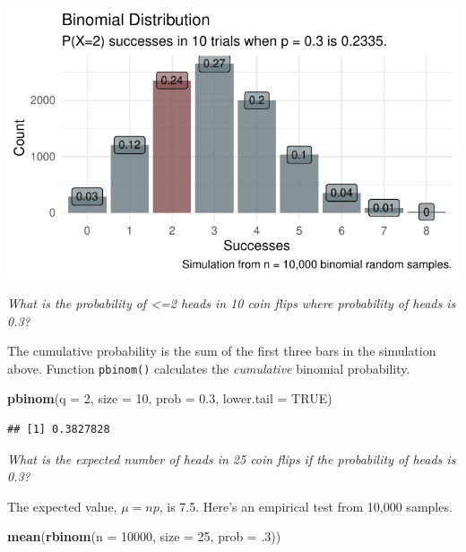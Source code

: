 \documentclass[
]{book}
\newenvironment{Shaded}{\begin{snugshade}}{\end{snugshade}}
\newcommand{\DataTypeTok}[1]{\textcolor[rgb]{0.13,0.29,0.53}{#1}}
\newcommand{\DecValTok}[1]{\textcolor[rgb]{0.00,0.00,0.81}{#1}}
\newcommand{\FloatTok}[1]{\textcolor[rgb]{0.00,0.00,0.81}{#1}}
\newcommand{\KeywordTok}[1]{\textcolor[rgb]{0.13,0.29,0.53}{\textbf{#1}}}
\newcommand{\NormalTok}[1]{#1}
\newcommand{\OtherTok}[1]{\textcolor[rgb]{0.56,0.35,0.01}{#1}}
\begin{document}
\includegraphics{data-sci_files/figure-latex/unnamed-chunk-3-1.pdf}

\emph{What is the probability of \textless=2 heads in 10 coin flips where probability of heads is 0.3?}

The cumulative probability is the sum of the first three bars in the simulation above. Function \texttt{pbinom()} calculates the \emph{cumulative} binomial probability.

\begin{Shaded}
\begin{Highlighting}[]
\KeywordTok{pbinom}\NormalTok{(}\DataTypeTok{q =} \DecValTok{2}\NormalTok{, }\DataTypeTok{size =} \DecValTok{10}\NormalTok{, }\DataTypeTok{prob =} \FloatTok{0.3}\NormalTok{, }\DataTypeTok{lower.tail =} \OtherTok{TRUE}\NormalTok{)}
\end{Highlighting}
\end{Shaded}

\begin{verbatim}
## [1] 0.3827828
\end{verbatim}

\emph{What is the expected number of heads in 25 coin flips if the probability of heads is 0.3?}

The expected value, \(\mu = np\), is 7.5. Here's an empirical test from 10,000 samples.

\begin{Shaded}
\begin{Highlighting}[]
\KeywordTok{mean}\NormalTok{(}\KeywordTok{rbinom}\NormalTok{(}\DataTypeTok{n =} \DecValTok{10000}\NormalTok{, }\DataTypeTok{size =} \DecValTok{25}\NormalTok{, }\DataTypeTok{prob =} \FloatTok{.3}\NormalTok{))}
\end{Highlighting}
\end{Shaded}
\end{document}
